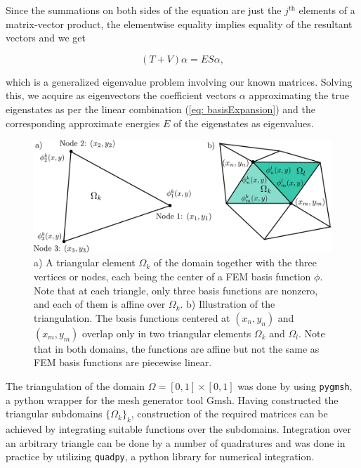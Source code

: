 \documentclass[a4paper,12pt]{article}
\begin{document}
Since the summations on both sides of the equation are just the $j^{\text{th}}$ elements of a matrix-vector product, the elementwise equality implies equality of the resultant vectors and we get

\begin{equation}
\label{eq: matrixFormFEMeq}
(T + V)\alpha = ES\alpha,
\end{equation}

which is a generalized eigenvalue problem involving our known matrices. Solving this, we acquire as eigenvectors the coefficient vectors $\alpha$ approximating the true eigenstates as per the linear combination (\ref{eq: basisExpansion}) and the corresponding approximate energies $E$ of the eigenstates as eigenvalues.





\begin{figure}[H]
\centering
\includegraphics[width=\textwidth]{../figs/triangle.pdf}
\caption{a) A triangular element $\Omega_k$ of the domain together with the three vertices or nodes, each being the center of a FEM basis function $\phi$. Note that at each triangle, only three basis functions are nonzero, and each of them is affine over $\Omega_k$. b) Illustration of the triangulation. The basis functions centered at $(x_n, y_n)$ and $(x_m, y_m)$ overlap only in two triangular elements $\Omega_k$ and $\Omega_l$. Note that in both domains, the functions are affine but not the same as FEM basis functions are piecewise linear.}
\label{fig: triangles}
\end{figure}

The triangulation of the domain $\Omega = [0,1]\times[0,1]$ was done by using \texttt{pygmsh}, a python wrapper for the mesh generator tool Gmsh. Having constructed the triangular subdomains $\lbrace \Omega_k \rbrace_k$, construction of the required matrices can be achieved by integrating suitable functions over the subdomains. Integration over an arbitrary triangle can be done by a number of quadratures and was done in practice by utilizing \texttt{quadpy}, a python library for numerical integration.
\end{document}
